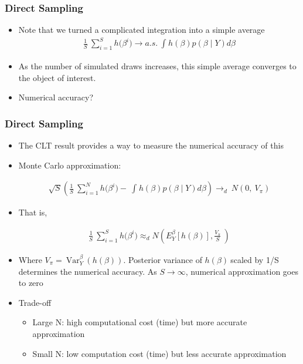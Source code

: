 \documentclass[
  shownotes,
  xcolor={svgnames},
  hyperref={colorlinks,citecolor=DarkBlue,linkcolor=DarkRed,urlcolor=DarkBlue}
  , aspectratio=169]{beamer}
\begin{document}
\begin{frame}[fragile]
\frametitle{Direct Sampling}


\begin{itemize}


\item Note that we turned a complicated integration into a simple average
\medskip
\begin{align}
\frac{1}{S}\ \sum_{i = 1}^{S}{h(\beta^{i}}) \rightarrow a.s.\ \int_{}^{}{h\left( \beta \right)p\left( \beta \middle| Y \right)d\beta}
\end{align}
\medskip
\item As the number of simulated draws increases, this simple average converges to the object of interest.
\medskip
\item Numerical accuracy?
\end{itemize}
\end{frame}
\begin{frame}[fragile]
\frametitle{Direct Sampling}

\begin{itemize}

\item The CLT result provides a way to measure the numerical accuracy of this
\medskip
\item Monte Carlo approximation:

\begin{align}
\sqrt{S}\left( \frac{1}{S}\ \sum_{i = 1}^{N}{h(\beta^{i}}) - \ \int_{}^{}{h\left( \beta \right)p\left( \beta \middle| Y \right)d\beta} \right) \rightarrow_{d}\ N(0,\ V_{\pi})
\end{align}


\item That is,

\begin{align}
\frac{1}{S}\ \sum_{i = 1}^{S}{h(\beta^{i}}) \approx_{d}N\left( E_{Y}^{\beta}\left\lbrack h\left( \beta \right) \right\rbrack,\frac{V_{\pi}}{S}\  \right)
\end{align}


\item Where $V_{\pi} = \ \text{Var}_{Y}^{\beta}\ (h\left( \beta \right))$. Posterior variance of $h\left( \beta \right)\ $scaled by 1/S determines the numerical accuracy. As $S \rightarrow \infty$, numerical approximation goes to zero

    \item Trade-off
    \begin{itemize}
        \item Large N: high computational cost (time) but more accurate approximation

        \item Small N: low computation cost (time) but less accurate approximation
    \end{itemize}
\end{itemize}
\end{frame}
\end{document}
